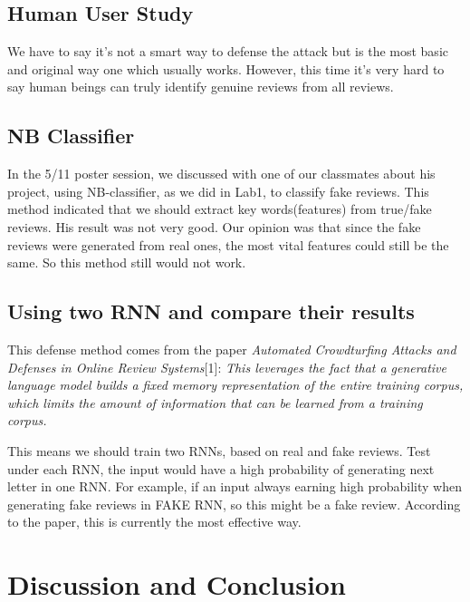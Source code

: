 \documentclass[conference]{IEEEtran}
\begin{document}
\subsection {Human User Study}
\par We have to say it's not a smart way to defense the attack but is the most basic and original way one which usually works. However, this time it’s very hard to say human beings can truly identify genuine reviews from all reviews.  

\subsection {NB Classifier}
\par In the 5/11 poster session, we discussed with one of our classmates about his project, using NB-classifier, as we did in Lab1, to classify fake reviews. This method indicated that we should extract key words(features) from true/fake reviews. His result was not very good. Our opinion was that since the fake reviews were generated from real ones, the most vital features could still be the same. So this method still would not work.

\subsection {Using two RNN and compare their results}
\par This defense method comes from the paper \emph{Automated Crowdturfing Attacks and Defenses in Online Review Systems}[1]:
\emph{This leverages the fact that a generative language model builds a fixed memory representation of the entire training corpus, which limits the amount of information that can be learned from a training corpus.}
\par This means we should train two RNNs, based on real and fake reviews. Test under each RNN, the input would have a high probability of generating next letter in one RNN. For example, if an input always earning high probability when generating fake reviews in FAKE RNN, so this might be a fake review. According to the paper, this is currently the most effective way.



\section{Discussion and Conclusion}
\end{document}
